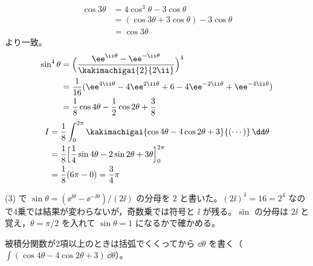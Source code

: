 \begin{align*}
\cos3\theta&=4\cos^{3}\theta-3\cos\theta\\
&=(\cos3\theta+3\cos\theta)-3\cos\theta\\
&=\cos3\theta
\end{align*}
より一致。
\begin{align*}
\sin^{4}\theta&=\Bigl(\frac{\ee^{\ii\theta}-\ee^{-\ii\theta}}{\kakimachigai{2}{2\ii}}\Bigr)^{4}\\
&=\frac{1}{16}(\ee^{4\ii\theta}-4\ee^{2\ii\theta}+6-4\ee^{-2\ii\theta}+\ee^{-4\ii\theta})\\
&=\frac{1}{8}\cos4\theta-\frac{1}{2}\cos2\theta+\frac{3}{8}
\end{align*}
\begin{align*}
I&=\frac{1}{8}\int_{0}^{2\pi}\kakimachigai{\cos4\theta-4\cos2\theta+3}{(\cdots)}\,\dd\theta\\
&=\frac{1}{8}\Bigl[\frac{1}{4}\sin4\theta-2\sin2\theta+3\theta\Bigr]_{0}^{2\pi}\\
&=\frac{1}{8}(6\pi-0)=\frac{3}{4}\pi
\end{align*}
\item (3) で $\sin\theta=(\ee^{\ii\theta}-\ee^{-\ii\theta})/(2\ii)$ の分母を $2$ と書いた。$(2\ii)^{4}=16=2^{4}$ なので4乗では結果が変わらないが，奇数乗では符号と $\ii$ が残る。$\sin$ の分母は $2\ii$ と覚え，$\theta=\pi/2$ を入れて $\sin\theta=1$ になるかで確かめる。
\item 被積分関数が2項以上のときは括弧でくくってから $\dd\theta$ を書く（$\int(\cos4\theta-4\cos2\theta+3)\,\dd\theta$）。
